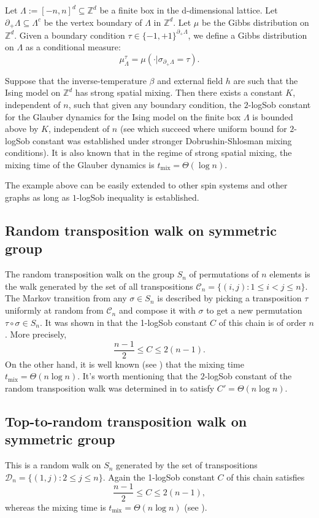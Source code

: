 \documentclass[11pt]{amsart}
\newcommand{\tm}{t_{\mathrm{mix}}}
\newcommand{\1}{\mathbf{1}}
\theoremstyle{definition}
\theoremstyle{plain}
\theoremstyle{remark}
\numberwithin{equation}{section}
\begin{document}
 Let $\Lambda := [-n, n]^d \subseteq \mathbb Z^d$ be a finite box in the d-dimensional lattice. Let $\partial_+ \Lambda \subseteq \Lambda^c $ be the vertex boundary of $\Lambda$ in $\mathbb Z^d$. Let $\mu$ be the Gibbs distribution on $\mathbb Z^d$. Given a boundary condition $\tau \in \{ -1, +1\}^{\partial_+ \Lambda}$, we define a Gibbs distribution on $\Lambda$ as a conditional measure:
 \[ \mu_{\Lambda}^\tau = \mu( \cdot|  \sigma_{\partial_+ \Lambda} = \tau ).\]

 Suppose that the inverse-temperature $\beta$ and external field $h$ are such that the Ising model on $\mathbb Z^d$ has strong spatial mixing. Then there exists a constant $K$, independent of $n$,  such that given any boundary condition, the $2$-logSob constant for the Glauber dynamics for the Ising model on the finite box $\Lambda$  is bounded above by $K$, independent of $n$ (see \cite{Martinelli94a, Martinelli94b} which succeed \cite{Stroock92a, Stroock92b, Zegar92} where uniform  bound for $2$-logSob constant was established under stronger Dobrushin-Shlosman mixing conditions). It is also known that in the regime of strong spatial mixing, the mixing time of the Glauber dynamics is $\tm = \Theta(\log n)$.

 The example above can be easily extended to other spin systems and other graphs as long as
 $1$-logSob inequality is established.

\subsection{Random transposition walk on symmetric group}\label{subsec:transpose_walk} The random transposition walk on the group $S_n$ of permutations  of $n$ elements is  the walk generated by the set of all transpositions $\mathcal C_n = \{ (i, j) : 1 \le i < j \le n\}$. The Markov transition from any $\sigma \in S_n$ is described by picking a transposition $\tau$ uniformly at random from $\mathcal C_n$ and compose it with $\sigma$ to get a new permutation $\tau \circ \sigma \in S_n$. It was shown in \cite{Quastel03, BT03, Goel04}  that the 1-logSob constant $C$ of this chain is of order $n$. More precisely,
\[ \frac{n-1}{2} \le C \le 2(n-1). \]
On the other hand, it is well known (see \cite{Diaconis81}) that the mixing time $\tm = \Theta(n \log n)$.  It's worth mentioning that the $2$-logSob constant of the random transposition walk was determined in \cite{Lee98} to satisfy $C' = \Theta(n \log n)$.

\subsection{Top-to-random transposition walk on symmetric group}\label{subsec:top_to_random} This is a random walk on $S_n$ generated by the set of transpositions  $\mathcal D_n = \{ (1, j) : 2 \le j \le n\}$. Again the 1-logSob constant $C$ of this chain satisfies \cite{Goel04}
\[ \frac{n-1}{2} \le C \le 2(n-1), \]
whereas the mixing time is $\tm = \Theta(n \log n)$ (see \cite{Diaconis92}).
\end{document}
